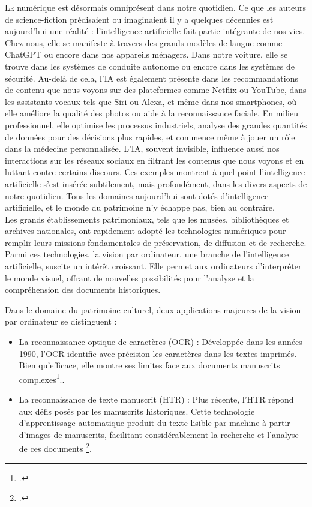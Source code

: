 \documentclass[a4paper,12pt,twoside]{book}
\begin{document}
\lettrine {L}e numérique est désormais omniprésent dans notre quotidien. Ce que
les auteurs de science-fiction prédisaient ou imaginaient il y a quelques
décennies est aujourd'hui une réalité : l’intelligence artificielle fait partie
intégrante de nos vies. Chez nous, elle se manifeste à travers des grands
modèles de langue comme ChatGPT ou encore dans nos appareils ménagers. Dans notre voiture, elle se trouve dans les systèmes de conduite autonome ou encore dans les systèmes
de sécurité. Au-delà de cela, l’IA est également présente dans les
recommandations de contenu que nous voyons sur des plateformes comme
Netflix ou YouTube, dans les assistants vocaux tels que Siri ou Alexa, et même
dans nos smartphones, où elle améliore la qualité des photos ou aide à la
reconnaissance faciale. En milieu professionnel, elle optimise les processus
industriels, analyse des grandes quantités de données pour des décisions plus
rapides, et commence même à jouer un rôle dans la médecine personnalisée.
L’IA, souvent invisible, influence aussi nos interactions sur les réseaux sociaux
en filtrant les contenus que nous voyons et en luttant contre certains discours.
Ces exemples montrent à quel point l’intelligence artificielle s’est insérée
subtilement, mais profondément, dans les divers aspects de notre quotidien.
Tous les domaines aujourd’hui sont dotés d’intelligence artificielle, et le monde
du patrimoine n’y échappe pas, bien au contraire.
\\

Les grands établissements patrimoniaux, tels que les musées, bibliothèques et archives nationales, ont rapidement adopté les technologies numériques pour remplir leurs missions fondamentales de préservation, de diffusion et de recherche. Parmi ces technologies, la vision par ordinateur, une branche de l'intelligence artificielle, suscite un intérêt croissant. Elle permet aux ordinateurs d'interpréter le monde visuel, offrant de nouvelles possibilités pour l'analyse et la compréhension des documents historiques.

Dans le domaine du patrimoine culturel, deux applications majeures de la vision par ordinateur se distinguent :
\\

\begin{itemize}
	\item La reconnaissance optique de caractères (OCR) : Développée dans les années 1990, l'OCR identifie avec précision les caractères dans les textes imprimés. Bien qu'efficace, elle montre ses limites face aux documents manuscrits complexes\footcite{nockels_gooding_ames_terras_2022}..
	
	\item La reconnaissance de texte manuscrit (HTR) :  Plus récente, l'HTR répond aux défis posés par les manuscrits historiques. Cette technologie d'apprentissage automatique produit du texte lisible par machine à partir d'images de manuscrits, facilitant considérablement la recherche et l'analyse de ces documents \footcite{nockels_gooding_ames_terras_2022}.
\end{itemize}
\end{document}
